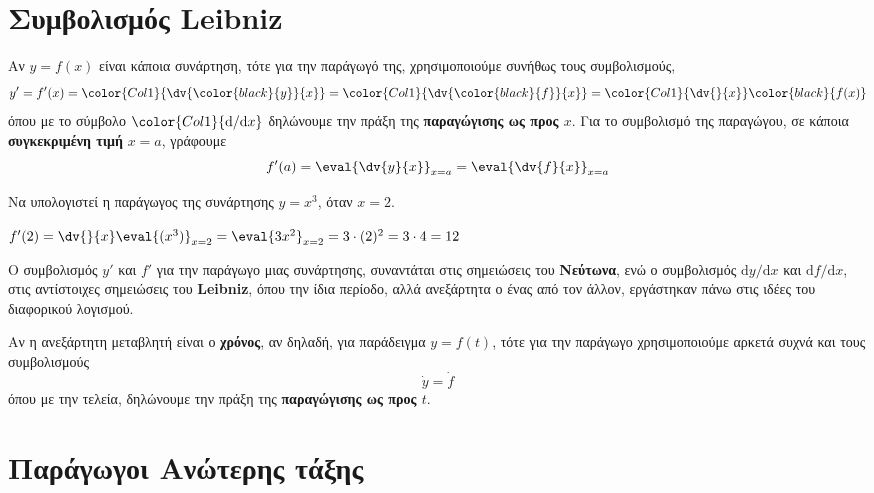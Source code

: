   \section{Συμβολισμός Leibniz}

  Αν $ y= f(x) $ είναι κάποια συνάρτηση, τότε για την παράγωγό της, χρησιμοποιούμε 
  συνήθως τους συμβολισμούς,
  \[
    y' = f'(x) = \color{Col1}{\dv{\color{black}{y}}{x}} =
    \color{Col1}{\dv{\color{black}{f}}{x}} =
    \color{Col1}{\dv{}{x}} \color{black}{f (x)} 
  \] 
  όπου με το σύμβολο $\color{Col1}{\mathrm{d}/\mathrm{d}x}$ δηλώνουμε την πράξη της 
  \textbf{παραγώγισης ως προς $x$}. Για το συμβολισμό της παραγώγου, σε κάποια 
  \textbf{συγκεκριμένη τιμή} $ x= a $, γράφουμε
  \[
    f'(a) = \eval{\dv{y}{x}}_{x= a} = \eval{\dv{f}{x}}_{x=a} 
  \] 
  \begin{example}
    Να υπολογιστεί η παράγωγος της συνάρτησης $ y= x^{3} $, όταν $ x=2 $.
  \end{example}
  \begin{solution}
    $ f'(2) = \dv{}{x}\eval{(x^{3})}_{x=2} = \eval{3x^{2}}_{x=2} = 3\cdot (2)^{2} = 3\cdot
    4 = 12 $
  \end{solution}
  \begin{rem}
    Ο συμβολισμός $ y' $ και $ f' $ για την παράγωγο μιας συνάρτησης, συναντάται στις
    σημειώσεις του \textbf{Νεύτωνα}, ενώ ο συμβολισμός $ \mathrm{d}y/\mathrm{d}x $ και 
    $ \mathrm{d}f/\mathrm{d}x $, στις αντίστοιχες σημειώσεις του \textbf{Leibniz}, όπου 
    την ίδια περίοδο, αλλά ανεξάρτητα ο ένας από τον άλλον, εργάστηκαν πάνω στις ιδέες του 
    διαφορικού λογισμού.
  \end{rem}
  \begin{rem}
    Αν η ανεξάρτητη μεταβλητή είναι ο \textbf{χρόνος}, αν δηλαδή, για παράδειγμα 
    $ y=f(t) $, τότε για την παράγωγο χρησιμοποιούμε αρκετά συχνά και τους συμβολισμούς
    \[
      \dot y = \dot f
    \] 
    όπου με την τελεία, δηλώνουμε την πράξη της \textbf{παραγώγισης ως προς $t$}. 
  \end{rem}


  \section{Παράγωγοι Ανώτερης τάξης}

